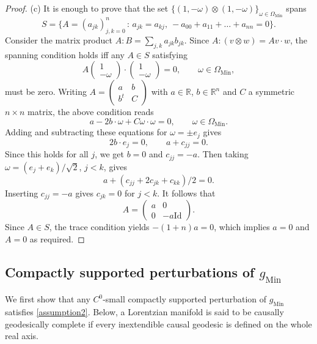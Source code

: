\documentclass[11pt,letterpaper]{amsart}
\theoremstyle{definition}
\numberwithin{equation}{section}
\newcommand{\mR}{\mathbb{R}}                    %
\newcommand{\gm}{g_{\mathrm{Min}}}
\begin{document}
\begin{proof}
(c) It is enough to prove that the set $\{ (1,-\omega) \otimes (1, -\omega) \}_{\omega \in \Omega_{\mathrm{Min}}}$ spans 
\[
S = \{ A = (a_{jk})_{j,k=0}^n \,:\, a_{jk} = a_{kj}, \ -a_{00} + a_{11} + \ldots + a_{nn} = 0 \}.
\]
Consider the matrix product $A : B = \sum_{j,k} a_{jk} b_{jk}$. Since $A : (v \otimes w) = Av \cdot w$, the spanning condition holds iff any $A \in S$ satisfying 
\[
A \begin{pmatrix} 1 \\ -\omega \end{pmatrix} \cdot \begin{pmatrix} 1 \\ -\omega \end{pmatrix} = 0, \qquad \omega \in \Omega_{\mathrm{Min}},
\]
must be zero. Writing $A = \begin{pmatrix} a & b \\ b^t & C \end{pmatrix}$ with $a \in \mR$, $b \in \mR^n$ and $C$ a symmetric $n \times n$ matrix, the above condition reads 
\[
a - 2 b \cdot \omega + C \omega \cdot \omega = 0, \qquad \omega \in \Omega_{\mathrm{Min}}.
\]
Adding and subtracting these equations for  $\omega = \pm e_j$ gives 
\[
2 b \cdot e_j = 0, \qquad a + c_{jj} = 0.
\]
Since this holds for all $j$, we get $b = 0$ and $c_{jj} = -a$. Then taking $\omega = (e_j+e_k)/\sqrt{2}$, $j < k$, gives 
\[
a + (c_{jj} + 2 c_{jk} + c_{kk})/2 = 0.
\]
Inserting $c_{jj} =  -a$ gives $c_{jk} = 0$ for $j < k$. It follows that  
\[
A = \begin{pmatrix} a & 0 \\ 0 & -a \mathrm{Id} \end{pmatrix}.
\]
Since $A \in S$, the trace condition yields $-(1+n)a = 0$, which implies $a=0$ and $A = 0$ as required.
\end{proof}



\subsection{Compactly supported perturbations of \texorpdfstring{$\gm$}{gMin}}

We first show that any $C^0$-small compactly supported perturbation of $\gm$ satisfies \eqref{assumption2}. Below, a Lorentzian manifold is said to be causally geodesically complete if every inextendible causal geodesic is defined on the whole real axis. 
\end{document}
